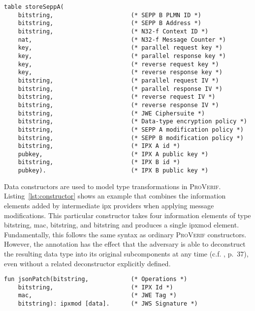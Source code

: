\begin{lstlisting}[caption={Declaration of local SEPP storage using tables},label={lst:tables},firstnumber=44]
table storeSeppA(
    bitstring,                      (* SEPP B PLMN ID *)
    bitstring,                      (* SEPP B Address *)
    bitstring,                      (* N32-f Context ID *)
    nat,                            (* N32-f Message Counter *)
    key,                            (* parallel request key *)
    key,                            (* parallel response key *)
    key,                            (* reverse request key *)
    key,                            (* reverse response key *)
    bitstring,                      (* parallel request IV *)
    bitstring,                      (* parallel response IV *)
    bitstring,                      (* reverse request IV *)
    bitstring,                      (* reverse response IV *)
    bitstring,                      (* JWE Ciphersuite *)
    bitstring,                      (* Data-type encryption policy *)
    bitstring,                      (* SEPP A modification policy *)
    bitstring,                      (* SEPP B modification policy *)
    bitstring,                      (* IPX A id *)
    pubkey,                         (* IPX A public key *)
    bitstring,                      (* IPX B id *)
    pubkey).                        (* IPX B public key *)
\end{lstlisting}

Data constructors are used to model type transformations in \textsc{ProVerif}.
Listing~\ref{lst:constructor} shows an example that combines the information elements added by intermediate \gls{ipx} providers when applying message modifications.
This particular constructor takes four information elements of type {\sffamily bitstring}, {\sffamily mac}, {\sffamily bitstring}, and {\sffamily bitstring} and produces a single {\sffamily ipxmod} element.
Fundamentally, this follows the same syntax as ordinary \textsc{ProVerif} constructors.
However, the {\sffamily [data]} annotation has the effect that the adversary is able to deconstruct the resulting data type into its original subcomponents at any time (c.f. \cite{blanchet2020proverif}, p.~37), even without a related deconstructor explicitly defined.

\begin{lstlisting}[caption={Definition of custom data constructor},label={lst:constructor},firstnumber=103]
fun jsonPatch(bitstring,            (* Operations *)
    bitstring,                      (* IPX Id *)
    mac,                            (* JWE Tag *)
    bitstring): ipxmod [data].      (* JWS Signature *)
\end{lstlisting}

